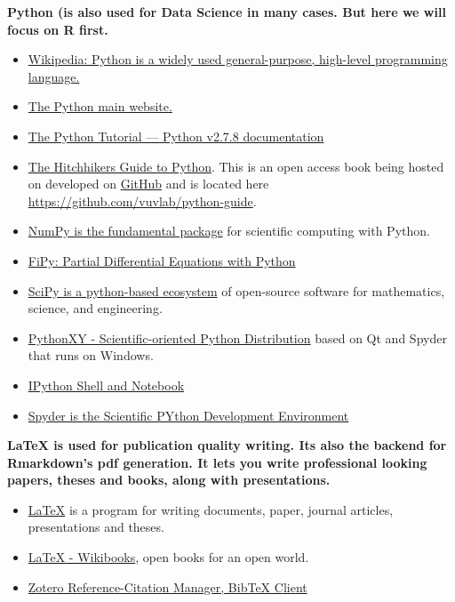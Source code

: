 \documentclass[11pt]{article} %
\begin{document}
  {\bf Python (is also used for Data Science in many cases. 
    But here we will focus on R first. } 
    \begin{itemize}
    	\item \href{"https://en.wikipedia.org/wiki/Python_(programming_language)"}{Wikipedia: Python is a widely used general-purpose, high-level programming language.}  \cite{python_python_2014}
    	\item \href{"https://www.python.org/"}{The Python main website.} \cite{python_python.org_2013}
    	\item \href{"https://docs.python.org/2/tutorial/"}{The Python Tutorial — Python v2.7.8 documentation}  \cite{python_python_2014}
    	\item \href{"http://docs.python-guide.org/en/latest/"}{The Hitchhikers Guide to Python}. This is an open access book being hosted on developed on \href{"https://github.com/"}{GitHub} and is located here \href{"https://github.com/vuvlab/python-guide"}{https://github.com/vuvlab/python-guide}. \cite{_hitchhikers_2014} \cite{_kennethreitz/python-guide_2014}
    	\item \href{"http://www.numpy.org"}{NumPy is the fundamental package} \cite{numpy_numpy_2014} for scientific computing with Python.
    	\item \href{"http://www.ctcms.nist.gov/fipy/"}{FiPy: Partial Differential Equations with Python} \cite{guyer_fipy:_2009}
    	\item \href{"http://www.scipy.org/"}{SciPy is a python-based ecosystem}  \cite{scipy_scipy.org_2014} of open-source software for mathematics, science, and engineering. 
    	\item \href{"https://code.google.com/p/pythonxy/"}{PythonXY - Scientific-oriented Python Distribution} based on Qt and Spyder that runs on Windows.  \cite{pythonxy_pythonxy_2014}
    	\item \href{"http://ipython.org/index.html"}{IPython Shell and Notebook}  \cite{ipython_ipython_2014}
    	\item \href{"https://code.google.com/p/spyderlib/"}{Spyder is the Scientific PYthon Development Environment}  \cite{spyder_spyder_2014}
    \end{itemize}
  
  {\bf LaTeX is used for publication quality writing. 
    Its also the backend for Rmarkdown's pdf generation. 
    It lets you write professional looking papers, theses and books, along with presentations. } 
    \begin{itemize}
    	\item \href{"http://www.tug.org/"}{LaTeX} is a program for writing documents, paper, journal articles, presentations and theses. \cite{_tex_2014}
    	\item \href{"http://en.wikibooks.org/wiki/LaTeX"}{LaTeX - Wikibooks}, open books for an open world. \cite{latex_latex_2014}
    	\item \href{"https://www.zotero.org/"}{Zotero Reference-Citation Manager, BibTeX Client}  \cite{zotero_zotero_2014}
    \end{itemize}
\end{document}

